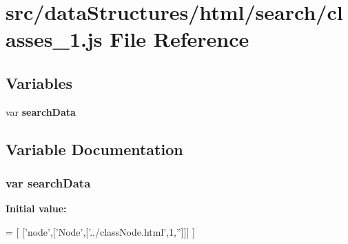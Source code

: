 \section{src/data\-Structures/html/search/classes\-\_\-1.js File Reference}
\label{classes__1_8js}
\subsection*{Variables}
\begin{DoxyCompactItemize}
\item 
var {\bf search\-Data}
\end{DoxyCompactItemize}


\subsection{Variable Documentation}
\subsubsection[{search\-Data}]{\setlength{\rightskip}{0pt plus 5cm}var search\-Data}\label{classes__1_8js_ad01a7523f103d6242ef9b0451861231e}
{\bfseries Initial value\-:}
\begin{DoxyCode}
=
[
  [\textcolor{stringliteral}{'node'},[\textcolor{stringliteral}{'Node'},[\textcolor{stringliteral}{'../classNode.html'},1,\textcolor{stringliteral}{''}]]]
]
\end{DoxyCode}
